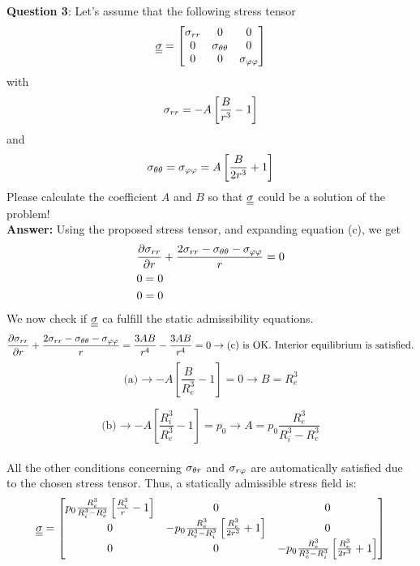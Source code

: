 \noindent \textbf{Question 3}: Let's assume that the following stress tensor 
\begin{equation}
\underline{\underline{\sigma}} = \left[ \begin{matrix}
\sigma_{rr} &0 &0 \\
0 & \sigma_{\theta\theta} & 0 \\
0 & 0 & \sigma_{\varphi\varphi}
\end{matrix} \right]
\end{equation}
with 
\begin{equation}
\sigma_{rr} = -A\left[\frac{B}{r^3} - 1 \right]
\end{equation}
and 
\begin{equation}
\sigma_{\theta\theta} = \sigma_{\varphi\varphi} = A \left[\frac{B}{2r^3} + 1 \right]
\end{equation}
Please calculate the coefficient $A$ and $B$ so that $\underline{\underline{\sigma}}$ could be a solution of the problem! \\ 

\textbf{Answer:} Using the proposed stress tensor, and expanding equation (c), we get
\begin{equation}
\begin{split}
& \frac{\partial \sigma_{rr}}{\partial r} + \frac{2\sigma_{rr} - \sigma_{\theta\theta} - \sigma_{\varphi\varphi}}{r} = 0 \\
& 0 = 0 \\
& 0 = 0
\end{split}
\end{equation}
We now check if $\underline{\underline{\sigma}}$ ca fulfill the static admissibility equations.
\begin{equation}
\frac{\partial \sigma_{rr}}{\partial r} + \frac{2\sigma_{rr} - \sigma_{\theta\theta} - \sigma_{\varphi\varphi}}{r} = \frac{3AB}{r^4} - \frac{3AB}{r^4} = 0 \rightarrow \text{(c) is OK. Interior equilibrium is satisfied.}
\end{equation}
\begin{equation}
\text{(a)} \rightarrow - A\left[
\frac{B}{R_e^3} - 1 \right] = 0 \rightarrow B = R_e^3
\end{equation}

\begin{equation}
\text{(b)} \rightarrow - A\left[
\frac{R_i^3}{R_e^3} - 1 \right] = p_0 \rightarrow A = p_0 \frac{R_e^3}{R_i^3 - R_e^3}
\end{equation}\\

All the other conditions concerning $\sigma_{\theta r}$ and $\sigma_{r\varphi}$ are automatically satisfied due to the chosen stress tensor. Thus, a statically admissible stress field is:
\begin{equation}
\underline{\underline{\sigma}} = \left[
\begin{matrix}
p_0 \frac{R_e^3}{R_i^3 - R_e^3} \left[
\frac{R_i^3}{r} - 1 \right] & 0 & 0 \\
0 & -p_0 \frac{R_e^3}{R_e^3 - R_i^3} \left[
\frac{R_e^3}{2r^3} + 1 \right] & 0 \\
0 & 0 & -p_0 \frac{R_e^3}{R_e^3 - R_i^3} \left[
\frac{R_e^3}{2r^3} + 1 \right]
\end{matrix}
\right]
\end{equation} \\



